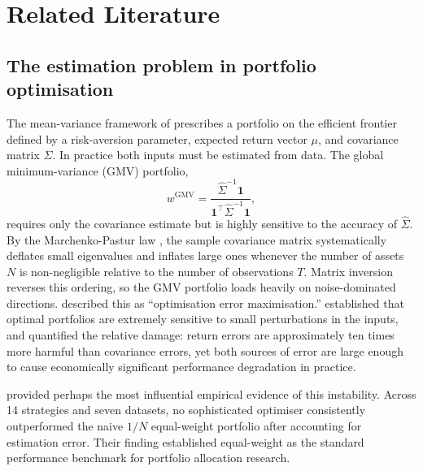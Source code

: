 \documentclass[a4paper,12pt]{report}
\begin{document}
\chapter{Related Literature}
\label{ch:litreview}

\section{The estimation problem in portfolio optimisation}
\label{sec:lit-mv}

The mean-variance framework of \citet{markowitz1952} prescribes a portfolio
on the efficient frontier defined by a risk-aversion parameter, expected
return vector $\mu$, and covariance matrix $\Sigma$. In practice both
inputs must be estimated from data. The global minimum-variance (GMV)
portfolio,
\begin{equation}
  w^{\mathrm{GMV}} = \frac{\hat{\Sigma}^{-1}\mathbf{1}}
                          {\mathbf{1}^{\top}\hat{\Sigma}^{-1}\mathbf{1}},
  \label{eq:gmv}
\end{equation}
requires only the covariance estimate but is highly sensitive to the accuracy
of $\hat{\Sigma}$. By the Marchenko-Pastur law \citep{marchenkopastur1967},
the sample covariance matrix systematically deflates small eigenvalues and
inflates large ones whenever the number of assets $N$ is non-negligible
relative to the number of observations $T$. Matrix inversion reverses this
ordering, so the GMV portfolio loads heavily on noise-dominated directions.
\citet{michaud1989} described this as ``optimisation error maximisation.''
\citet{bestgrauer1991} established that optimal portfolios are extremely
sensitive to small perturbations in the inputs, and \citet{chopraziemba1993}
quantified the relative damage: return errors are approximately ten times more
harmful than covariance errors, yet both sources of error are large enough to
cause economically significant performance degradation in practice.

\citet{demiguel2009} provided perhaps the most influential empirical evidence
of this instability. Across 14 strategies and seven datasets, no sophisticated
optimiser consistently outperformed the naive $1/N$ equal-weight portfolio
after accounting for estimation error. Their finding established equal-weight
as the standard performance benchmark for portfolio allocation research.
\end{document}
